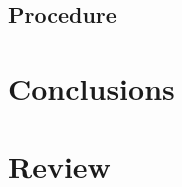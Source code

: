 \documentclass[a4]{report}
\def\achapter{preamble}
\begin{document}
	\section{Procedure}




	\chapter*{Conclusions}
	\def\achapter{Conclusions}
	



	\chapter*{Review}
	\def\achapter{Review}
	
\end{document}
